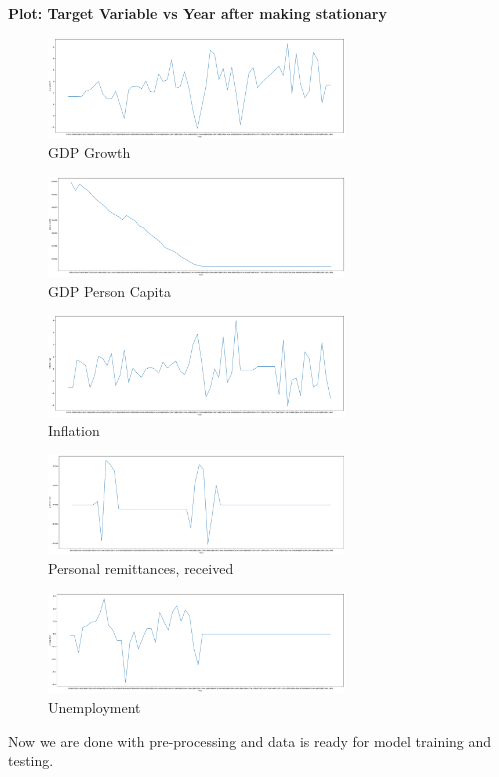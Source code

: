 \vspace{10mm}
\textbf{Plot: Target Variable vs Year after making stationary}\\

\begin{figure}[H]
    \centering
    \includegraphics[width=0.7\textwidth]{Images/gdp-growth vs Year.pdf}
    \caption{GDP Growth}
    \label{fig1}
\end{figure}


\begin{figure}[H]
    \centering
    \includegraphics[width=0.7\textwidth]{Images/gdp-p-capita vs Year.pdf}
    \caption{GDP Person Capita}
    \label{fig1}
\end{figure}

\begin{figure}[H]
    \centering
    \includegraphics[width=0.7\textwidth]{Images/inflation-cpi vs Year.pdf}
    \caption{Inflation}
    \label{fig1}
\end{figure}

\begin{figure}[H]
    \centering
    \includegraphics[width=0.7\textwidth]{Images/p-remittances vs Year.pdf}
    \caption{Personal remittances, received}
    \label{fig1}
\end{figure}

\begin{figure}[H]
    \centering
    \includegraphics[width=0.7\textwidth]{Images/unemp-total vs Year.pdf}
    \caption{Unemployment}
    \label{fig1}
\end{figure}

Now we are done with pre-processing and data is ready for model training and testing.
